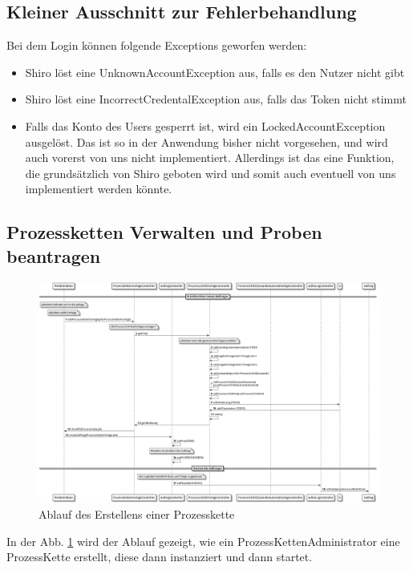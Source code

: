 \documentclass[enabledeprecatedfontcommands,fontsize=12pt,paper=a4,twoside]{scrartcl}
\begin{document}
{\subsection{Kleiner Ausschnitt zur Fehlerbehandlung}
Bei dem Login können folgende Exceptions geworfen werden:
\begin{itemize}
  \item Shiro löst eine UnknownAccountException aus, falls es den Nutzer nicht gibt
  \item Shiro löst eine IncorrectCredentalException aus, falls das Token nicht
  stimmt
  \item Falls das Konto des Users gesperrt ist, wird ein LockedAccountException
  ausgelöst. Das ist so in der Anwendung bisher nicht vorgesehen, und wird auch vorerst von uns nicht implementiert. Allerdings ist das eine Funktion, die grundsätzlich von Shiro geboten wird und somit auch eventuell von uns implementiert werden könnte.
\end{itemize}

\subsection{Prozessketten Verwalten und Proben beantragen}

\begin{figure}[H]
  \includegraphics[width=\linewidth]{UML/aw/pkErstellen.png}
  \caption{Ablauf des Erstellens einer Prozesskette}
  \label{fig:pkErstellen}
\end{figure}

In der Abb. \ref{fig:pkErstellen} wird der Ablauf gezeigt, wie ein
ProzessKettenAdministrator eine ProzessKette erstellt, diese dann instanziert
und dann startet.

}
\end{document}
